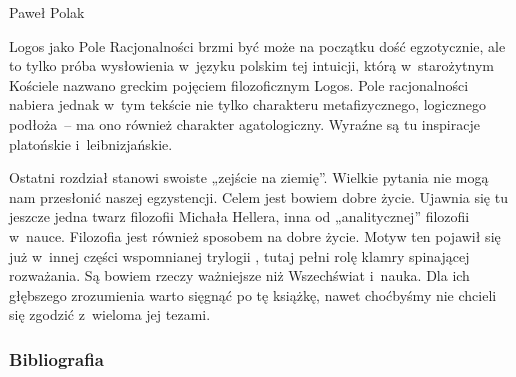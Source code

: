 \begin{recplenv}{Paweł Polak}

Logos jako Pole Racjonalności brzmi być może na początku dość egzotycznie, ale to tylko próba wysłowienia w~języku
polskim tej intuicji, którą w~starożytnym Kościele nazwano greckim pojęciem filozoficznym Logos. Pole racjonalności
nabiera jednak w~tym tekście nie tylko charakteru metafizycznego, logicznego podłoża~-- ma ono również charakter
agatologiczny. Wyraźne są tu inspiracje platońskie i~leibnizjańskie.


Ostatni rozdział stanowi swoiste „zejście na ziemię”. Wielkie pytania nie mogą nam przesłonić naszej egzystencji.
Celem jest bowiem dobre życie. Ujawnia się tu jeszcze jedna twarz filozofii Michała Hellera, inna od „analitycznej”
filozofii w~nauce. Filozofia jest również sposobem na dobre życie. Motyw ten pojawił się już w~innej części wspomnianej
trylogii
\parencite{heller_jak_2009},
tutaj pełni rolę klamry spinającej rozważania. Są bowiem rzeczy ważniejsze niż Wszechświat i~nauka.
Dla ich głębszego zrozumienia warto sięgnąć po tę książkę, nawet choćbyśmy nie chcieli się zgodzić z~wieloma jej
tezami.




\subsubsection{Bibliografia}\nopagebreak[4]
\end{recplenv}
